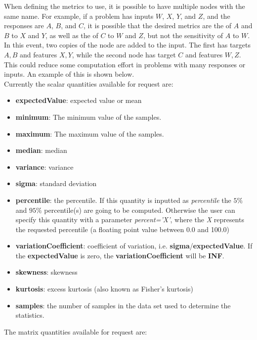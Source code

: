 \begin{itemize}
    \nb When defining the metrics to use, it is possible to have multiple nodes with the same name.  For
    example, if a problem has inputs $W$, $X$, $Y$, and $Z$, and the responses are $A$, $B$, and $C$, it is possible that
    the desired metrics are the  of $A$ and $B$ to $X$ and $Y$, as well as the
     of $C$ to $W$ and $Z$, but not the sensitivity of $A$ to $W$.   In this event, two
    copies of the  node are added to the input.  The first has targets $A,B$ and features
    $X,Y$, while the second node has target $C$ and features $W,Z$.  This could reduce some computation effort
    in problems with many responses or inputs.  An example of this is shown below.
  \\ Currently the scalar quantities available for request are:
  \begin{itemize}
    \item \textbf{expectedValue}: expected value or mean
    \item \textbf{minimum}: The minimum value of the samples.
    \item \textbf{maximum}: The maximum value of the samples.
    \item \textbf{median}: median
    \item \textbf{variance}: variance
    \item \textbf{sigma}: standard deviation
    \item \textbf{percentile}: the percentile. If this quantity is inputted as \textit{percentile} the $5\%$ and $95\%$ percentile(s) are going to be computed.
                               Otherwise the user can specify this quantity with a parameter \textit{percent='X'}, where the \textit{X} represents the requested
                               percentile (a floating point value between 0.0 and 100.0)
    \item \textbf{variationCoefficient}: coefficient of variation, i.e. \textbf{sigma}/\textbf{expectedValue}. \nb If the \textbf{expectedValue} is zero,
    the \textbf{variationCoefficient} will be \textbf{INF}.
    \item \textbf{skewness}: skewness
    \item \textbf{kurtosis}: excess kurtosis (also known as Fisher's kurtosis)
    \item \textbf{samples}: the number of samples in the data set used to determine the statistics.
  \end{itemize}
  The matrix quantities available for request are:
  \begin{itemize}

\end{itemize}
\end{itemize}
